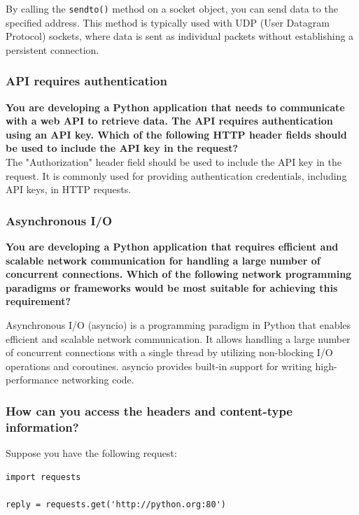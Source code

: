By calling the \texttt{sendto()} method on a socket object, you can send data to the specified address. This method is typically used with UDP (User Datagram Protocol) sockets, where data is sent as individual packets without establishing a persistent connection.


\subsubsection{API requires authentication}
\textbf{You are developing a Python application that needs to communicate with a web API to retrieve data. The API requires authentication using an API key. Which of the following HTTP header fields should be used to include the API key in the request?}\\

The "Authorization" header field should be used to include the API key in the request. It is commonly used for providing authentication credentials, including API keys, in HTTP requests.

\subsubsection{Asynchronous I/O}
\textbf{You are developing a Python application that requires efficient and scalable network communication for handling a large number of concurrent connections. Which of the following network programming paradigms or frameworks would be most suitable for achieving this requirement?}

Asynchronous I/O (asyncio) is a programming paradigm in Python that enables efficient and scalable network communication. It allows handling a large number of concurrent connections with a single thread by utilizing non-blocking I/O operations and coroutines. asyncio provides built-in support for writing high-performance networking code.

\subsubsection{How can you access the headers and content-type information?}
Suppose you have the following request:
\begin{codebox}
\begin{verbatim}
import requests
 
reply = requests.get('http://python.org:80')
\end{verbatim}
\end{codebox}

